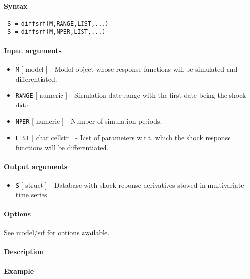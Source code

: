 


	\paragraph{Syntax}
 
 \begin{verbatim}
 S = diffsrf(M,RANGE,LIST,...)
 S = diffsrf(M,NPER,LIST,...)
 \end{verbatim}
 
 \paragraph{Input arguments}
 
 \begin{itemize}
 \item
   \texttt{M} {[} model {]} - Model object whose response functions will
   be simulated and differentiated.
 \item
   \texttt{RANGE} {[} numeric {]} - Simulation date range with the first
   date being the shock date.
 \item
   \texttt{NPER} {[} numeric {]} - Number of simulation periods.
 \item
   \texttt{LIST} {[} char \textbar{} cellstr {]} - List of parameters
   w.r.t. which the shock response functions will be differentiated.
 \end{itemize}
 
 \paragraph{Output arguments}
 
 \begin{itemize}
 \item
   \texttt{S} {[} struct {]} - Database with shock reponse derivatives
   stowed in multivariate time series.
 \end{itemize}
 
 \paragraph{Options}
 
 See \url{model/srf} for options available.
 
 \paragraph{Description}
 
 \paragraph{Example}


